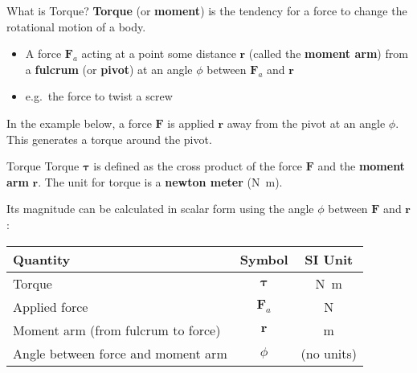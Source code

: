 \documentclass[12pt,compress,aspectratio=169]{beamer}
\begin{document}
\begin{frame}{What is Torque?}
  \textbf{Torque} (or \textbf{moment}) is the tendency for a force to change
  the rotational motion of a body.
  \begin{itemize}
  \item A force $\bm{F}_a$ acting at a point some distance $\bm{r}$ (called the
    \textbf{moment arm}) from a \textbf{fulcrum} (or \textbf{pivot}) at an angle
    $\phi$ between $\bm{F}_a$ and $\bm{r}$
  \item e.g.\ the force to twist a screw
  \end{itemize}
  In the example below, a force $\bm{F}$ is applied $\bm{r}$ away from
  the pivot at an angle $\phi$. This generates a torque around the pivot.
  \begin{center}
  \end{center}
\end{frame}



\begin{frame}{Torque}
  Torque $\bm\tau$ is defined as the cross product of the force $\bm{F}$ and the
  \textbf{moment arm} $\bm{r}$. The unit for torque is a \textbf{newton meter}
  (\si{\newton\metre}).


  \vspace{-.1in}Its magnitude can be calculated in scalar form
  using the angle $\phi$ between $\bm{F}$ and $\bm{r}$:

  \begin{center}
    \begin{tabular}{l|c|c}
      \rowcolor{pink}
      \textbf{Quantity} & \textbf{Symbol} & \textbf{SI Unit} \\ \hline
      Torque        & $\bm\tau$ & \si{\newton\metre} \\
      Applied force & $\bm{F}_a$  & \si\newton \\
      Moment arm (from fulcrum to force) & $\bm{r}$ & \si\metre \\
      Angle between force and moment arm & $\phi$ & (no units)
    \end{tabular}
  \end{center}
\end{frame}
\end{document}

